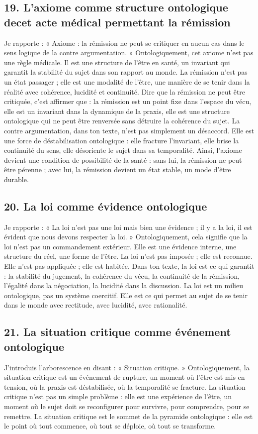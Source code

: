 \documentclass[12pt,letterpaper,oneside]{article}
\begin{document}
\subsection*{19. L’axiome comme structure ontologique decet acte médical permettant la rémission}
Je rapporte :
« Axiome : la rémission ne peut se critiquer en aucun cas dans le sens logique de la contre argumentation. »
Ontologiquement, cet axiome n’est pas une règle médicale. Il est une structure de l’être en santé, un invariant qui garantit la stabilité du sujet dans son rapport au monde. La rémission n’est pas un état passager ; elle est une modalité de l’être, une manière de se tenir dans la réalité avec cohérence, lucidité et continuité.
Dire que la rémission ne peut être critiquée, c’est affirmer que :
	la rémission est un point fixe dans l’espace du vécu,
	elle est un invariant dans la dynamique de la praxis,
	elle est une structure ontologique qui ne peut être renversée sans détruire la cohérence du sujet.
La contre argumentation, dans ton texte, n’est pas simplement un désaccord. Elle est une force de déstabilisation ontologique : elle fracture l’invariant, elle brise la continuité du sens, elle désoriente le sujet dans sa temporalité.
Ainsi, l’axiome devient une condition de possibilité de la santé : sans lui, la rémission ne peut être pérenne ; avec lui, la rémission devient un état stable, un mode d’être durable.

\subsection*{20. La loi comme évidence ontologique}
Je rapporte :
« La loi n’est pas une loi mais bien une évidence ; il y a la loi, il est évident que nous devons respecter la loi. »
Ontologiquement, cela signifie que la loi n’est pas un commandement extérieur. Elle est une évidence interne, une structure du réel, une forme de l’être. La loi n’est pas imposée ; elle est reconnue. Elle n’est pas appliquée ; elle est habitée.
Dans ton texte, la loi est ce qui garantit :
	la stabilité du jugement,
	la cohérence du vécu,
	la continuité de la rémission,
	l’égalité dans la négociation,
	la lucidité dans la discussion.
La loi est un milieu ontologique, pas un système coercitif. Elle est ce qui permet au sujet de se tenir dans le monde avec rectitude, avec lucidité, avec rationalité.

\subsection*{21. La situation critique comme événement ontologique}
J’introduis l’arborescence en disant :
« Situation critique. »
Ontologiquement, la situation critique est un événement de rupture, un moment où l’être est mis en tension, où la praxis est déstabilisée, où la temporalité se fracture. La situation critique n’est pas un simple problème : elle est une expérience de l’être, un moment où le sujet doit se reconfigurer pour survivre, pour comprendre, pour se remettre.
La situation critique est le sommet de la pyramide ontologique : elle est le point où tout commence, où tout se déploie, où tout se transforme.
\end{document}
